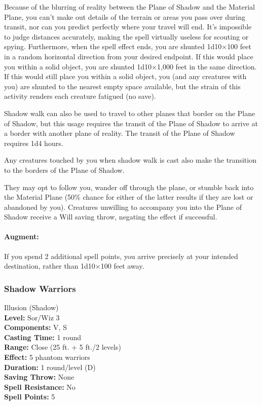 Because of the blurring of reality between the Plane of Shadow and the Material Plane, 
you can't make out details of the terrain or areas you pass over during transit, nor can you predict perfectly where your travel will end. 
It's impossible to judge distances accurately, making the spell virtually useless for scouting or spying. 
Furthermore, when the spell effect ends, you are shunted 1d10$\times$100 feet in a random horizontal direction from your desired endpoint. 
If this would place you within a solid object, you are shunted 1d10$\times$1,000 feet in the same direction. 
If this would still place you within a solid object, you (and any creatures with you) are shunted to the nearest empty space available, 
but the strain of this activity renders each creature fatigued (no save).

Shadow walk can also be used to travel to other planes that border on the Plane of Shadow, 
but this usage requires the transit of the Plane of Shadow to arrive at a border with another plane of reality. The transit of the Plane of Shadow requires 1d4 hours.

Any creatures touched by you when shadow walk is cast also make the transition to the borders of the Plane of Shadow.

They may opt to follow you, wander off through the plane, or stumble back into the Material Plane 
(50\% chance for either of the latter results if they are lost or abandoned by you). 
Creatures unwilling to accompany you into the Plane of Shadow receive a Will saving throw, negating the effect if successful. 

\paragraph{Augment:} If you spend 2 additional spell points, you arrive precisely at your intended destination, rather than 1d10$\times$100 feet away.
\subsubsection{Shadow Warriors}
\label{Spell:ShadowWarriors}
Illusion (Shadow)
\\ \textbf{Level:} Sor/Wiz 3
\\ \textbf{Components:} V, S
\\ \textbf{Casting Time:} 1 round
\\ \textbf{Range:} Close (25 ft. + 5 ft./2 levels)
\\ \textbf{Effect:} 5 phantom warriors
\\ \textbf{Duration:} 1 round/level (D)
\\ \textbf{Saving Throw:} None
\\ \textbf{Spell Resistance:} No
\\ \textbf{Spell Points:} 5

